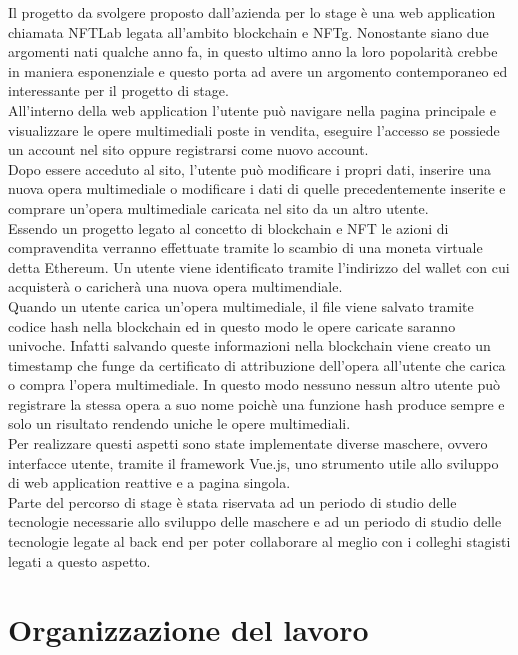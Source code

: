 Il progetto da svolgere proposto dall'azienda per lo stage è una web application chiamata NFTLab legata all'ambito blockchain e \gls{NFTg}. Nonostante siano due argomenti nati qualche anno fa, in questo ultimo anno la loro popolarità crebbe in maniera esponenziale e questo porta ad avere un argomento contemporaneo ed interessante per il progetto di stage.\\
All'interno della web application l'utente può navigare nella pagina principale e visualizzare le opere multimediali poste in vendita, eseguire l'accesso se possiede un account nel sito oppure registrarsi come nuovo account.\\
Dopo essere acceduto al sito, l'utente può modificare i propri dati, inserire una nuova opera multimediale o modificare i dati di quelle precedentemente inserite e comprare un'opera multimediale caricata nel sito da un altro utente.\\
Essendo un progetto legato al concetto di blockchain e \gls{NFT} le azioni di compravendita verranno effettuate tramite lo scambio di una moneta virtuale detta Ethereum. Un utente viene identificato tramite l'indirizzo del wallet con cui acquisterà o caricherà una nuova opera multimendiale.\\
Quando un utente carica un'opera multimediale, il file viene salvato tramite codice hash nella blockchain ed in questo modo le opere caricate saranno univoche. Infatti salvando queste informazioni nella blockchain viene creato un timestamp che funge da certificato di attribuzione dell'opera all'utente che carica o compra l'opera multimediale. In questo modo nessuno nessun altro utente può registrare la stessa opera a suo nome poichè una funzione hash produce sempre e solo un risultato rendendo uniche le opere multimediali.\\
Per realizzare questi aspetti sono state implementate diverse maschere, ovvero interfacce utente, tramite il framework Vue.js, uno strumento utile allo sviluppo di web application reattive e a pagina singola.\\
Parte del percorso di stage è stata riservata ad un periodo di studio delle tecnologie necessarie allo sviluppo delle maschere e ad un periodo di studio delle tecnologie legate al back end per poter collaborare al meglio con i colleghi stagisti legati a questo aspetto.

\section{Organizzazione del lavoro}

